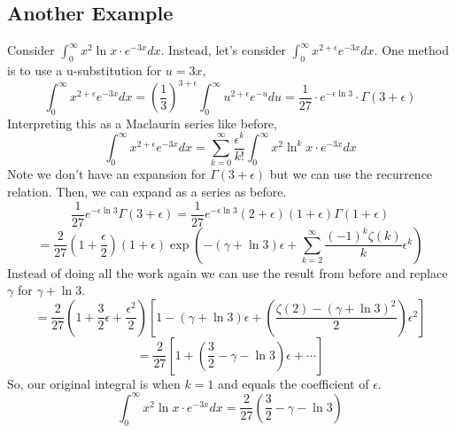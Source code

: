 \documentclass[../main.tex]{subfiles}
\begin{document}
    \subsection{Another Example}
        Consider $\int_{0}^{\infty}x^{2}\ln x\cdot e^{-3x}dx$. Instead, let's consider $\int_{0}^{\infty}x^{2+\epsilon}e^{-3x}dx$. One method is to use a u-substitution for $u=3x$,
        $$\int_{0}^{\infty}x^{2+\epsilon}e^{-3x}dx=(\frac{1}{3})^{3+\epsilon}\int_{0}^{\infty}u^{2+\epsilon}e^{-u}du=\frac{1}{27}\cdot e^{-\epsilon\ln 3}\cdot \Gamma(3+\epsilon)$$
        Interpreting this as a Maclaurin series like before,
        $$\int_{0}^{\infty}x^{2+\epsilon}e^{-3x}dx=\sum_{k=0}^{\infty}\frac{\epsilon^{k}}{k!}\int_{0}^{\infty}x^{2}\ln^{k}x\cdot e^{-3x}dx$$
        Note we don't have an expansion for $\Gamma(3+\epsilon)$ but we can use the recurrence relation. Then, we can expand as a series as before.
        $$\frac{1}{27}e^{-\epsilon\ln 3}\Gamma(3+\epsilon)=\frac{1}{27}e^{-\epsilon\ln 3}(2+\epsilon)(1+\epsilon)\Gamma(1+\epsilon)$$
        $$=\frac{2}{27}(1+\frac{\epsilon}{2})(1+\epsilon)\exp\left(-(\gamma+\ln 3)\epsilon+\sum_{k=2}^{\infty}\frac{(-1)^{k}\zeta(k)}{k}\epsilon^{k}\right)$$
        Instead of doing all the work again we can use the result from before and replace $\gamma$ for $\gamma+\ln 3$.
        $$=\frac{2}{27}\left(1+\frac{3}{2}\epsilon+\frac{\epsilon^{2}}{2}\right)\left[1-(\gamma+\ln 3)\epsilon+\left(\frac{\zeta(2)-(\gamma+\ln 3)^{2}}{2}\right)\epsilon^{2}\right]$$
        $$=\frac{2}{27}\left[1+\left(\frac{3}{2}-\gamma-\ln 3\right)\epsilon+\cdots\right]$$
        So, our original integral is when $k=1$ and equals the coefficient of $\epsilon$.
        $$\boxed{\int_{0}^{\infty}x^{2}\ln x\cdot e^{-3x}dx=\frac{2}{27}\left(\frac{3}{2}-\gamma-\ln 3\right)}$$
\end{document}
